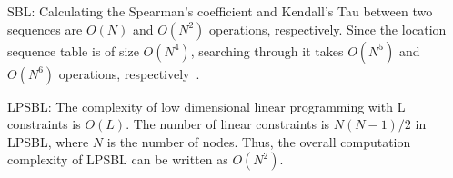 SBL: Calculating the Spearman’s coefficient and Kendall’s Tau
between two sequences are $O(N)$ and $O(N^2)$ operations,
respectively. Since the location sequence table is of size
$O(N^4)$, searching through it takes $O(N^5)$ and $O(N^6)$ operations,
respectively~\cite{yedavalli2008sequence}.

LPSBL: The complexity of low dimensional linear programming
with L constraints is $O(L)$\cite{Griva2009}. The number of linear constraints is $N(N-1)/2$ in LPSBL,
where $N$ is the number of nodes. Thus, the overall computation
complexity of LPSBL can be written as $O(N^2)$.



